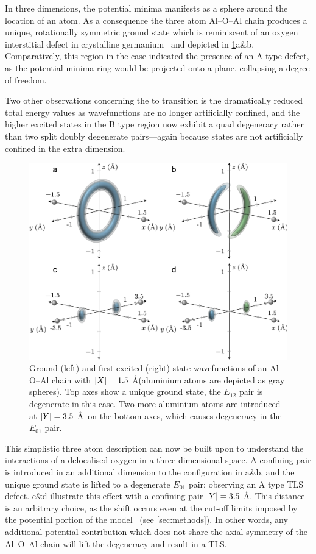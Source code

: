 In three dimensions, the potential minima manifests as a sphere around the location of an atom. As a consequence the three atom Al--O--Al chain produces a unique, rotationally symmetric ground state which is reminiscent of an oxygen interstitial defect in crystalline germanium~\cite{Artacho1995} and depicted in \cref{fig:lift}a\&b.
Comparatively, this region in the  case indicated the presence of an A type defect, as the  potential minima ring would be projected onto a plane, collapsing a degree of freedom.

Two other observations concerning the  to  transition is the dramatically reduced total energy values as wavefunctions are no longer artificially confined, and the higher excited states in the B type region now exhibit a quad degeneracy rather than two split doubly degenerate pairs---again because states are not artificially confined in the extra dimension.

\begin{figure}[htb]
  \includegraphics[width=\textwidth]{figures/lift}
  \caption[ground]{\label{fig:lift}Ground (left) and first excited (right) state wavefunctions of an Al--O--Al chain with $\lvert X\rvert = 1.5$ \AA (aluminium atoms are depicted as gray spheres). Top axes show a unique ground state, the $E_{12}$ pair is degenerate in this case. Two more aluminium atoms are introduced at $\lvert Y\rvert = 3.5$ \AA\ on the bottom axes, which causes degeneracy in the $E_{01}$ pair.}
\end{figure}

This simplistic three atom description can now be built upon to understand the interactions of a delocalised oxygen in a three dimensional space.
A confining pair is introduced in an additional dimension to the configuration in a\&b, and the unique ground state is lifted to a degenerate $E_{01}$ pair; observing an A type TLS defect.
c\&d illustrate this effect with a confining pair $\lvert Y\rvert = 3.5$ \AA.
This distance is an arbitrary choice, as the shift occurs even at the cut-off limits imposed by the potential portion of the model~\cite{Streitz1994} (see \cref{sec:methods}).
In other words, any additional potential contribution which does not share the axial symmetry of the Al--O--Al chain will lift the degeneracy and result in a TLS.

